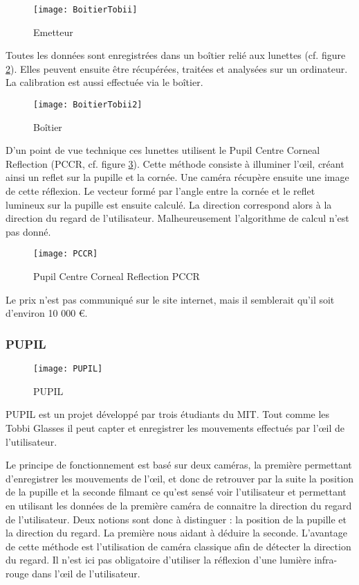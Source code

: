 \begin{figure}[H]
  \centering
  \texttt{[image: BoitierTobii]}
  \caption{Emetteur}
  \label{fig:Emetteur}
\end{figure}

Toutes les données sont enregistrées dans un boîtier relié aux lunettes (cf. figure \ref{fig:Boitier}). Elles peuvent ensuite être récupérées, traitées et analysées sur un ordinateur. La calibration est aussi effectuée via le boîtier.

\begin{figure}[H]
  \centering
  \texttt{[image: BoitierTobii2]}
  \caption{Boîtier}
  \label{fig:Boitier}
\end{figure}

D’un point de vue technique ces lunettes utilisent le Pupil Centre Corneal Reflection (PCCR, cf. figure \ref{fig:PCCR}). Cette méthode consiste à illuminer l’œil, créant ainsi un reflet sur la pupille et la cornée. Une caméra récupère ensuite une image de cette réflexion. Le vecteur formé par l’angle entre la cornée et le reflet lumineux sur la pupille est ensuite calculé. La direction correspond alors à la direction du regard de l’utilisateur.
Malheureusement l’algorithme de calcul n’est pas donné.

\begin{figure}[H]
  \centering
  \texttt{[image: PCCR]}
  \caption{Pupil Centre Corneal Reflection PCCR}
  \label{fig:PCCR}
\end{figure}

Le prix n’est pas communiqué sur le site internet, mais il semblerait qu’il soit d’environ 10 000 \euro{}.

\subsubsection{PUPIL}

\begin{figure}[h]
  \centering
  \texttt{[image: PUPIL]}
  \caption{PUPIL}
  \label{fig:PUPIL}
\end{figure}

PUPIL est un projet développé par trois étudiants du MIT. Tout comme les Tobbi Glasses il peut capter et enregistrer les mouvements effectués par l’œil de l’utilisateur.

Le principe de fonctionnement est basé sur deux caméras,  la première permettant d’enregistrer les mouvements de l’œil, et donc de retrouver par la suite la position de la pupille et la seconde filmant ce qu’est sensé voir l’utilisateur et permettant en utilisant les données de la première caméra de connaitre la direction du regard de l’utilisateur.
Deux notions sont donc à distinguer : la position de la pupille et la direction du regard. La première nous aidant à déduire la seconde. L’avantage de cette méthode est l’utilisation de caméra classique afin de détecter la direction du regard. Il n’est ici pas obligatoire d’utiliser la réflexion d’une lumière infra-rouge dans l’œil de l’utilisateur.


